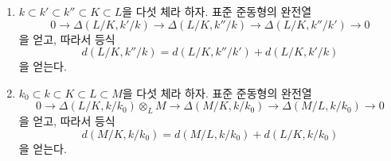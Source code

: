 \begin{proposition}[21.6.4]
\label{0.21.6.4-ko}
\begin{enumerate}
  \item[\rm (i)] $k\subset k'\subset k''\subset K\subset L$을 다섯 체라
  하자. 표준 준동형의 완전열
\begin{equation}
\tag{21.6.4.1}
\label{0.21.6.4.1-ko}
0\to\Delta(L/K,k'/k)\to\Delta(L/K,k''/k)\to
\Delta(L/K,k''/k')\to0
\end{equation}
을 얻고, 따라서 등식
\begin{equation}
\tag{21.6.4.2}
\label{0.21.6.4.2-ko}
d(L/K,k''/k)=d(L/K,k''/k')+d(L/K,k'/k)
\end{equation}
을 얻는다.
  \item[\rm (ii)] $k_0\subset k\subset K\subset L\subset M$을 다섯 체라
  하자. 표준 준동형의 완전열
\begin{equation}
\tag{21.6.4.3}
\label{0.21.6.4.3-ko}
0\to\Delta(L/K,k/k_0)\otimes_LM\to\Delta(M/K,k/k_0)
\to\Delta(M/L,k/k_0)\to0
\end{equation}
을 얻고, 따라서 등식
\begin{equation}
\tag{21.6.4.4}
\label{0.21.6.4.4-ko}
d(M/K,k/k_0)=d(M/L,k/k_0)+d(L/K,k/k_0)
\end{equation}
을 얻는다.
\end{enumerate}
\end{proposition}

